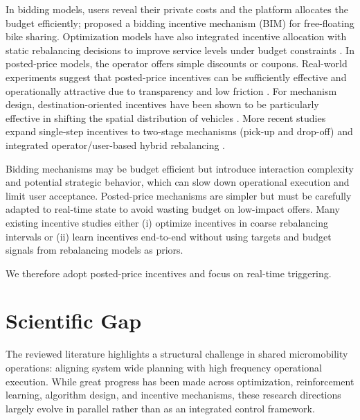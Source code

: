 In bidding models, users reveal their private costs and the platform allocates the budget efficiently; \textcite{cheng2021} proposed a bidding incentive mechanism (BIM) for free-floating bike sharing. Optimization models have also integrated incentive allocation with static rebalancing decisions to improve service levels under budget constraints \parencite{li2021static}. In posted-price models, the operator offers simple discounts or coupons. Real-world experiments suggest that posted-price incentives can be sufficiently effective and operationally attractive due to transparency and low friction \parencite{neijmeijer2020}. For mechanism design, destination-oriented incentives have been shown to be particularly effective in shifting the spatial distribution of vehicles \parencite{duan2019}. More recent studies expand single-step incentives to two-stage mechanisms (pick-up and drop-off) and integrated operator/user-based hybrid rebalancing \parencite{wang2021two, emami2024integrated}.

Bidding mechanisms may be budget efficient but introduce interaction complexity and potential strategic behavior, which can slow down operational execution and limit user acceptance. Posted-price mechanisms are simpler but must be carefully adapted to real-time state to avoid wasting budget on low-impact offers. Many existing incentive studies either (i) optimize incentives in coarse rebalancing intervals or (ii) learn incentives end-to-end without using targets and budget signals from rebalancing models as priors.

We therefore adopt posted-price incentives and focus on real-time triggering.

\section{Scientific Gap}

The reviewed literature highlights a structural challenge in shared micromobility operations: aligning system wide planning with high frequency operational execution. While great progress has been made across optimization, reinforcement learning, algorithm design, and incentive mechanisms, these research directions largely evolve in parallel rather than as an integrated control framework.

